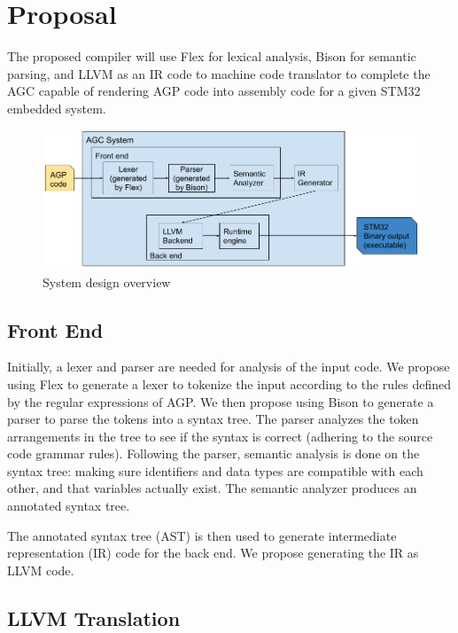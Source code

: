 \documentclass[11pt]{article}
\begin{document}
\section{Proposal}

The proposed compiler will use Flex for lexical analysis, Bison for semantic parsing, and  LLVM as an IR code to machine code translator to complete the AGC capable of rendering AGP code into assembly code for a given STM32 embedded system. 



\begin{figure}[hbt]
   \begin{center}
     \includegraphics[width=170mm]{agcv2.png}
   \end{center}
  \caption{System design overview}
  \label{fig-sysdesov}
  \end{figure}



\subsection{Front End}

Initially, a lexer and parser are needed for analysis of the input code. We propose using Flex to generate a lexer to tokenize the input according to the rules defined by the regular expressions of AGP. We then propose using Bison to generate a parser to parse the tokens into a syntax tree. The parser analyzes the token arrangements in the tree to see if the syntax is correct (adhering to the source code grammar rules). Following the parser, semantic analysis is done  on the syntax tree: making sure identifiers and data types are compatible with each other, and that variables actually exist. The semantic analyzer produces an annotated syntax tree.

The annotated syntax tree (AST) is then used to generate intermediate representation (IR) code for the back end. We propose generating the IR as LLVM code.


\subsection{LLVM Translation}
\end{document}

